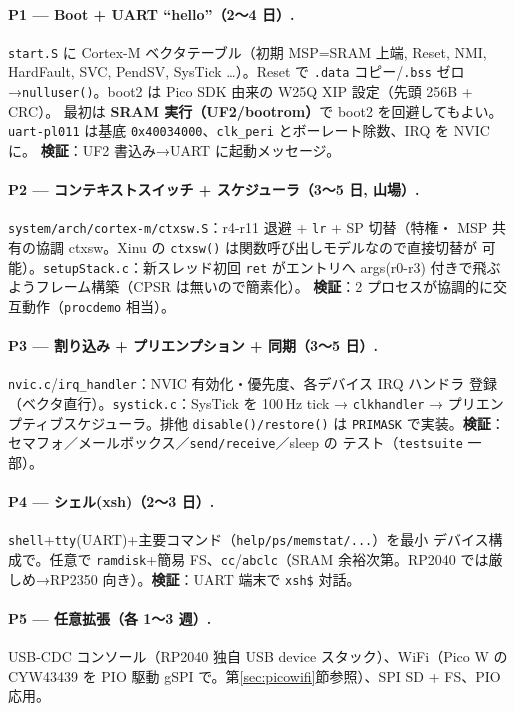 \documentclass[a4paper,11pt]{ltjsarticle}
\newcommand{\cmd}[1]{\texttt{#1}}
\begin{document}
\paragraph{P1 — Boot + UART ``hello''（2〜4 日）.}
\texttt{start.S} に Cortex-M ベクタテーブル（初期 MSP=SRAM 上端, Reset, NMI,
HardFault, SVC, PendSV, SysTick …）。Reset で \texttt{.data} コピー/\texttt{.bss}
ゼロ→\texttt{nulluser()}。boot2 は Pico SDK 由来の W25Q XIP 設定（先頭 256B + CRC）。
最初は \textbf{SRAM 実行（UF2/bootrom）}で boot2 を回避してもよい。\texttt{uart-pl011}
は基底 \texttt{0x40034000}、\texttt{clk\_peri} とボーレート除数、IRQ を NVIC に。
\textbf{検証}：UF2 書込み→UART に起動メッセージ。

\paragraph{P2 — コンテキストスイッチ + スケジューラ（3〜5 日, 山場）.}
\texttt{system/arch/cortex-m/ctxsw.S}：r4-r11 退避 + \texttt{lr} + SP 切替（特権・
MSP 共有の協調 ctxsw。Xinu の \texttt{ctxsw()} は関数呼び出しモデルなので直接切替が
可能）。\texttt{setupStack.c}：新スレッド初回 \texttt{ret} がエントリへ args(r0-r3)
付きで飛ぶようフレーム構築（CPSR は無いので簡素化）。
\textbf{検証}：2 プロセスが協調的に交互動作（\texttt{procdemo} 相当）。

\paragraph{P3 — 割り込み + プリエンプション + 同期（3〜5 日）.}
\texttt{nvic.c}/\texttt{irq\_handler}：NVIC 有効化・優先度、各デバイス IRQ ハンドラ
登録（ベクタ直行）。\texttt{systick.c}：SysTick を 100\,Hz tick → \texttt{clkhandler}
→ プリエンプティブスケジューラ。排他 \texttt{disable()/restore()} は \texttt{PRIMASK}
で実装。\textbf{検証}：セマフォ／メールボックス／\texttt{send/receive}／sleep の
テスト（\texttt{testsuite} 一部）。

\paragraph{P4 — シェル(xsh)（2〜3 日）.}
\texttt{shell}+\texttt{tty}(UART)+主要コマンド（\texttt{help/ps/memstat/...}）を最小
デバイス構成で。任意で \texttt{ramdisk}+簡易 FS、\texttt{cc}/\texttt{abclc}（SRAM
余裕次第。RP2040 では厳しめ→RP2350 向き）。\textbf{検証}：UART 端末で \cmd{xsh\$} 対話。

\paragraph{P5 — 任意拡張（各 1〜3 週）.}
USB-CDC コンソール（RP2040 独自 USB device スタック）、WiFi（Pico W の CYW43439 を
PIO 駆動 gSPI で。第\ref{sec:picowifi}節参照）、SPI SD + FS、PIO 応用。
\end{document}
